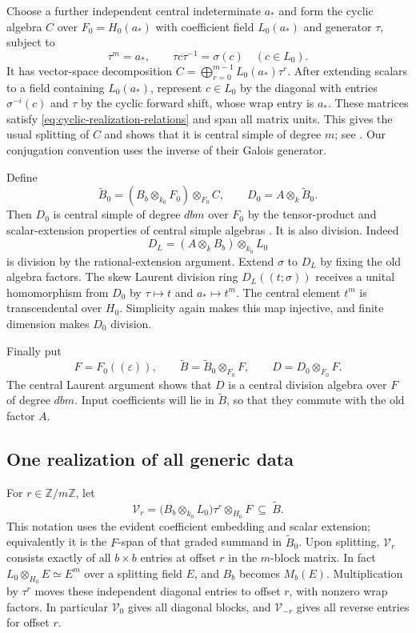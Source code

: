 Choose a further independent central indeterminate $a_*$ and form the
cyclic algebra $C$ over $F_0=H_0(a_*)$ with coefficient field
$L_0(a_*)$ and generator $\tau$, subject to
\begin{equation}
 \tau^m=a_*,\qquad \tau c\tau^{-1}=\sigma(c)
 \quad(c\in L_0).
 \label{eq:cyclic-realization-relations}
\end{equation}
It has vector-space decomposition
$C=\bigoplus_{r=0}^{m-1}L_0(a_*)\tau^r$.
After extending scalars to a field containing $L_0(a_*)$, represent
$c\in L_0$ by the diagonal with entries $\sigma^{-i}(c)$ and
$\tau$ by the cyclic forward shift, whose wrap entry is $a_*$.
These matrices satisfy \eqref{eq:cyclic-realization-relations} and
span all matrix units.  This gives the usual splitting of $C$ and
shows that it is central simple of degree $m$; see
\cite[Construction~2.5.1 and Proposition~2.5.2]{GilleSzamuely2006}.
Our conjugation convention uses the inverse of their Galois generator.

Define
\[
 \widetilde B_0=(B_b\otimes_{k_0}F_0)\otimes_{F_0}C,
 \qquad D_0=A\otimes_k\widetilde B_0.
\]
Then $D_0$ is central simple of degree $dbm$ over $F_0$ by the tensor-product and scalar-extension properties of
central simple algebras
\cite[Chapter~IV, Corollary~2.8 and Proposition~2.15]{MilneCFT}.
It is also division. Indeed
\[
 D_L=(A\otimes_k B_b)\otimes_{k_0}L_0
\]
is division by the rational-extension argument.  Extend $\sigma$ to
$D_L$ by fixing the old algebra factors.  The skew Laurent division
ring $D_L((t;\sigma))$ receives a unital homomorphism from $D_0$
by $\tau\mapsto t$ and $a_*\mapsto t^m$.  The central element
$t^m$ is transcendental over $H_0$.  Simplicity again makes this map
injective, and finite dimension makes $D_0$ division.

Finally put
\[
 F=F_0((\varepsilon)),\qquad
 \widetilde B=\widetilde B_0\otimes_{F_0}F,\qquad
 D=D_0\otimes_{F_0}F.
\]
The central Laurent argument shows that $D$ is a central division
algebra over $F$ of degree $dbm$.  Input coefficients will lie in
$\widetilde B$, so that they commute with the old factor $A$.

\subsection{One realization of all generic data}

For $r\in\mathbb Z/m\mathbb Z$, let
\[
 \mathcal V_r=
 \bigl(B_b\otimes_{k_0}L_0\bigr)\tau^r
 \otimes_{H_0}F
 \ \subseteq\ \widetilde B.
\]
This notation uses the evident coefficient embedding and scalar
extension; equivalently it is the $F$-span of that graded summand in
$\widetilde B_0$.  Upon splitting, $\mathcal V_r$ consists exactly
of all $b\times b$ entries at offset $r$ in the $m$-block matrix.
In fact $L_0\otimes_{H_0}E\simeq E^m$ over a splitting field $E$,
and $B_b$ becomes $M_b(E)$.  Multiplication by $\tau^r$ moves these
independent diagonal entries to offset $r$, with nonzero wrap factors.
In particular $\mathcal V_0$ gives all diagonal blocks, and
$\mathcal V_{-r}$ gives all reverse entries for offset $r$.

